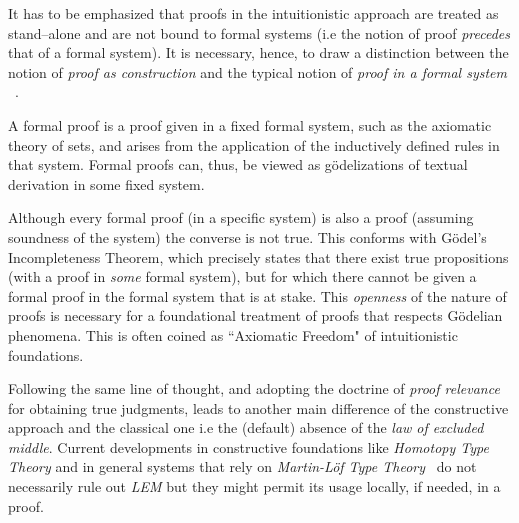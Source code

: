 It has to be emphasized that proofs in the intuitionistic approach  are treated as stand--alone and are not bound to formal systems (i.e the notion of proof \textit{precedes} that of a formal system). It is necessary, hence, to draw a distinction  between the notion of \emph{proof as construction} and the typical notion of \emph{proof in a formal system} ~\cite{Harper2013,Harper2012}.

  A formal proof
is a proof given in a fixed formal system, such as the axiomatic theory of sets, and arises
from the application of the inductively defined rules in that system. Formal proofs can, thus, be viewed as g\"{o}delizations of textual derivation in some fixed system. 

Although every formal proof (in a specific system)
 is also a proof (assuming soundness of the system) the converse is not true.  This conforms with 
 G\"{o}del's Incompleteness Theorem, which precisely states that there
exist true propositions (with a proof in \emph{some} formal system), but for which there cannot be given a formal proof in the formal system that is at stake. This \emph{openness} of the nature of proofs is necessary for a foundational treatment of proofs that respects  G\"{o}delian phenomena. This is often coined as ``Axiomatic Freedom"
of intuitionistic foundations.

Following the same line of thought, and adopting the doctrine of \emph{proof relevance} for obtaining true judgments, leads to another main difference of the constructive approach and the classical one i.e the (default) absence of the \emph{law of excluded middle}. Current developments in constructive foundations like \emph{Homotopy Type Theory} and in general systems that rely on \emph{Martin-L\"{o}f Type Theory}~\cite{martin1984intuitionistic} do not necessarily rule out \emph{LEM} but they might permit its usage locally, if needed, in a proof. 


